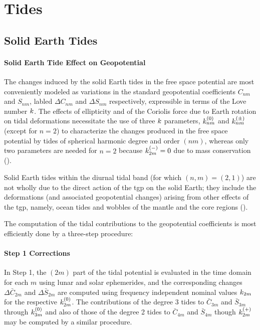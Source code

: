 \chapter{Tides}
\label{ch:tides}

\section{Solid Earth Tides}
\label{sec:solid-earth-tides}

\subsubsection{Solid Earth Tide Effect on Geopotential}
\label{sssec:solid-earth-tide-geopotential}
The changes induced by the solid Earth tides in the free space potential are 
most conveniently modeled as variations in the standard geopotential 
coefficients $C_{nm}$ and $S_{nm}$, labled $\Delta C_{nm}$ and $\Delta S_{nm}$ 
respectively, expressible in terms of the Love number $k$. The effects of 
ellipticity and of the Coriolis force due to Earth rotation on tidal 
deformations necessitate the use of three $k$ parameters, $k ^{(0)}_{nm}$ 
and $k ^{(\pm)}_{nm}$ (except for $n = 2$) to characterize the
changes produced in the free space potential by tides of spherical harmonic 
degree and order $(nm)$, whereas only two parameters are needed for $n = 2$ 
because $k ^{(-)}_{2m} = 0$ due to mass conservation (\cite{iers2010}).

Solid Earth tides within the diurnal tidal band (for which $(n,m) = (2,1)$) are 
not wholly due to the direct action of the \gls{tgp} on the solid Earth; they 
include the deformations (and associated geopotential changes) arising from 
other effects of the \gls{tgp}, namely, ocean tides and wobbles of the mantle 
and the core regions (\cite{iers2010}).

The computation of the tidal contributions to the geopotential coefficients is 
most efficiently done by a three-step procedure:
 
\subsubsection{Step 1 Corrections}\label{sssec:step1-corr-earth-tides}
In Step 1, the $(2m)$ part of the tidal potential is evaluated in the 
time domain for each $m$ using lunar and solar ephemerides, and the 
corresponding changes $\Delta \bar{C}_{2m}$ and $\Delta \bar{S}_{2m}$ are 
computed using frequency independent nominal values $k _{2m}$ for the 
respective $k ^{(0)}_{2m}$. The contributions of the degree 3 tides to
$\bar{C}_{3m}$ and $\bar{S}_{3m}$ through $k ^{(0)}_{3m}$ and also of 
those of the degree 2 tides to $\bar{C}_{4m}$ and $\bar{S}_{4m}$ though 
$k ^{(+)}_{2m}$ may be computed by a similar procedure.

